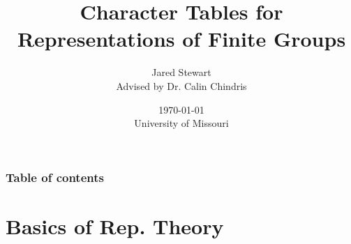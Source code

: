 %
% 





\newtheorem{proposition}[theorem]{Proposition} 


\title{Character Tables for Representations of Finite Groups}  
\author{Jared Stewart \\Advised by Dr. Calin Chindris }

\date{\today \\ University of Missouri} 



\begin{frame}
\titlepage
\end{frame}

\begin{frame}\frametitle{Table of contents}\tableofcontents
\end{frame} 

\section{Basics of Rep. Theory}
